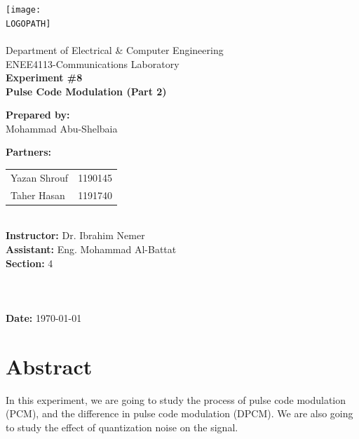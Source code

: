 \documentclass[12pt]{article}
\def \LOGOPATH {assets/birzeit-logo.png}
\def \DEPARTEMENT {Department of Electrical \& Computer Engineering}
\def \COURSENUM {ENEE4113}
\def \COURSENAME {Communications Laboratory}
\def \REPORTTITLE {Pulse Code Modulation (Part 2)}
\def \STUDENTNAME {Mohammad Abu-Shelbaia}
\def \PARTNERAN {Yazan Shrouf}
\def \PARTNERAID {1190145}
\def \PARTNERBN {Taher Hasan}
\def \PARTNERBID {1191740}
\def \STUDENTID {1200198}
\def \INSTRUCTOR {Dr. Ibrahim Nemer}
\def \ASSISTANT {Eng. Mohammad Al-Battat}
\def \REPORTNUM {8}
\begin{document}

\begin{titlepage}
    \vfill
    \begin{center}
        \texttt{[image: \\LOGOPATH]} \\
        \hfill \\
        \Large{\DEPARTEMENT} \\
        \Large{\COURSENUM\;-\;\COURSENAME} \\
        \vfill
        \textbf{\LARGE{Experiment \#\REPORTNUM}} \\
        \textbf{\LARGE{\REPORTTITLE}}
    \end{center}
    \vfill
    \begin{flushleft}
        \Large{\textbf{Prepared by:}\\ \STUDENTNAME\quad\STUDENTID} \\
        \Large{\textbf{Partners:}\\ 
        \begin{tabular}{@{}l@{\quad}l}
            \PARTNERAN & \PARTNERAID \\
            \PARTNERBN & \PARTNERBID \\
        \end{tabular}} \\
        \Large{\textbf{Instructor:} \INSTRUCTOR} \\
        \Large{\textbf{Assistant:} \ASSISTANT} \\
        \Large{\textbf{Section:} 4}\\
        \LARGE{\textbf{ }}\\
        \LARGE{\textbf{ }}\\
        \LARGE{\textbf{ }}\\
        \Large{\textbf{Date:} \today}\\
    \end{flushleft}
    \vfill
\end{titlepage}

\clearpage
{
\centering
\section*{Abstract}
In this experiment, we are going to study the process of pulse code modulation (PCM), and the difference in pulse code modulation (DPCM). We are also going to study the effect of quantization noise on the signal.
\clearpage
}
\end{document}
